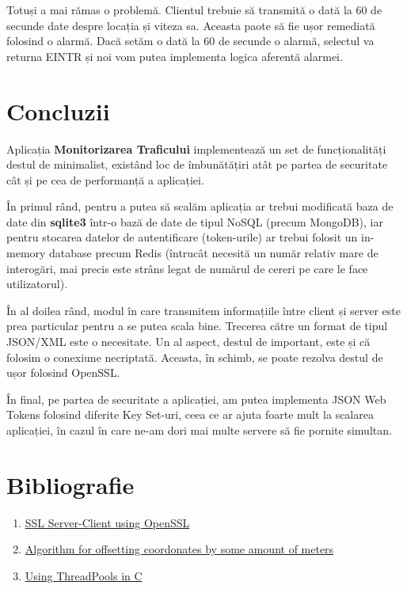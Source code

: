 \documentclass{article}
\begin{document}
Totuși a mai rămas o problemă. Clientul trebuie să transmită o dată la 60 de secunde date despre locația și viteza sa. Aceasta paote să fie ușor remediată folosind o alarmă. Dacă setăm o dată la 60 de secunde o alarmă, selectul va returna EINTR și noi vom putea implementa logica aferentă alarmei.


\section{Concluzii}
Aplicația \textbf{Monitorizarea Traficului} implementează un set de funcționalități destul de minimalist, existând loc de îmbunătățiri atât pe partea de securitate cât și pe cea de performanță a aplicației. 

În primul rând, pentru a putea să scalăm aplicația ar trebui modificată baza de date din \textbf{sqlite3} într-o bază de date de tipul NoSQL (precum MongoDB), iar pentru stocarea datelor de autentificare (token-urile) ar trebui folosit un in-memory database precum Redis (întrucât necesită un număr relativ mare de interogări, mai precis este strâns legat de numărul de cereri pe care le face utilizatorul).

În al doilea rând, modul în care transmitem informațiile între client și server este prea particular pentru a se putea scala bine. Trecerea către un format de tipul JSON/XML este o necesitate. Un al aspect, destul de important, este și că folosim o conexiune necriptată. Aceasta, în schimb, se poate rezolva destul de ușor folosind OpenSSL.

În final, pe partea de securitate a aplicației, am putea implementa JSON Web Tokens folosind diferite Key Set-uri, ceea ce ar ajuta foarte mult la scalarea aplicației, în cazul în care ne-am dori mai multe servere să fie pornite simultan.
\section{Bibliografie}
\begin{enumerate}
    \item   \href{https://aticleworld.com/ssl-server-client-using-openssl-in-c/}{SSL Server-Client using OpenSSL}
    \item   \href{https://gis.stackexchange.com/questions/2951/algorithm-for-offsetting-a-latitude-longitude-by-some-amount-of-meters}{Algorithm for offsetting coordonates by some amount of meters}
    \item   \href{https://nachtimwald.com/2019/04/12/thread-pool-in-c/}{Using ThreadPools in C}
\end{enumerate}
\end{document}
